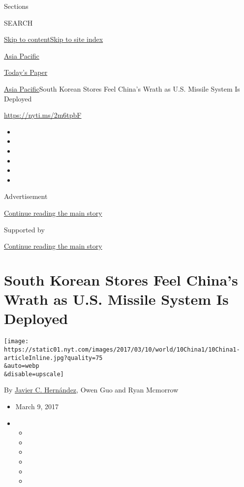 Sections

SEARCH

\protect\hyperlink{site-content}{Skip to
content}\protect\hyperlink{site-index}{Skip to site index}

\href{https://www.nytimes.com/section/world/asia}{Asia Pacific}

\href{https://myaccount.nytimes.com/auth/login?response_type=cookie\&client_id=vi}{}

\href{https://www.nytimes.com/section/todayspaper}{Today's Paper}

\href{/section/world/asia}{Asia Pacific}\textbar{}South Korean Stores
Feel China's Wrath as U.S. Missile System Is Deployed

\url{https://nyti.ms/2m6tpbF}

\begin{itemize}
\item
\item
\item
\item
\item
\item
\end{itemize}

Advertisement

\protect\hyperlink{after-top}{Continue reading the main story}

Supported by

\protect\hyperlink{after-sponsor}{Continue reading the main story}

\hypertarget{south-korean-stores-feel-chinas-wrath-as-us-missile-system-is-deployed}{%
\section{South Korean Stores Feel China's Wrath as U.S. Missile System
Is
Deployed}\label{south-korean-stores-feel-chinas-wrath-as-us-missile-system-is-deployed}}

\texttt{[image: https://static01.nyt.com/images/2017/03/10/world/10China1/10China1-articleInline.jpg?quality=75\\\&auto=webp\\\&disable=upscale]}

By \href{https://www.nytimes.com/by/javier-c-hernandez}{Javier C.
Hernández}, Owen Guo and Ryan Mcmorrow

\begin{itemize}
\item
  March 9, 2017
\item
  \begin{itemize}
  \item
  \item
  \item
  \item
  \item
  \item
  \end{itemize}
\end{itemize}

